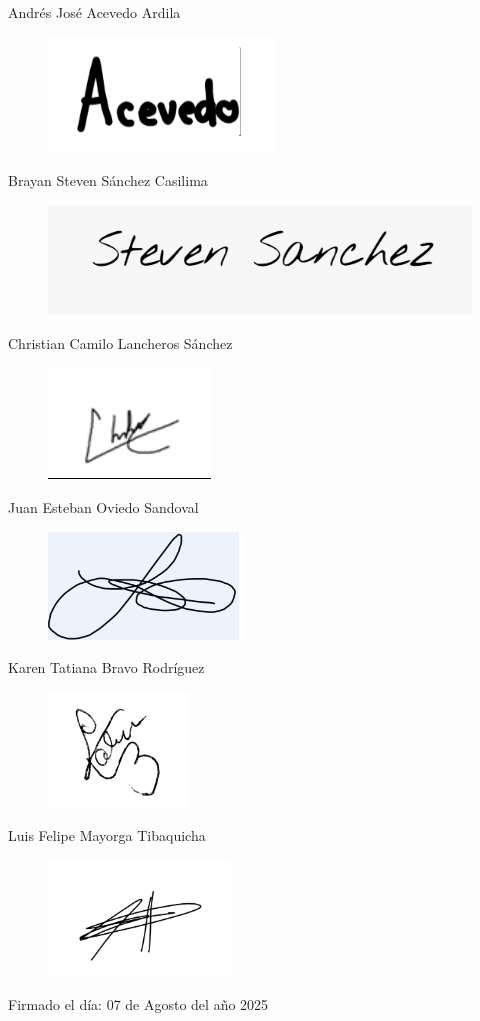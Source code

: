 Andrés José Acevedo Ardila
\begin{figure}[H]
    \centering
    \includegraphics[width=0.2\linewidth]{firmas/firma-andres.png}
\end{figure}

Brayan Steven Sánchez Casilima
\begin{figure}[H]
    \centering
    \includegraphics[width=0.2\linewidth]{firmas/firma-steveb.png}
\end{figure}

Christian Camilo Lancheros Sánchez
\begin{figure}[H]
    \centering
    \includegraphics[width=0.2\linewidth]{firmas/firma-cris.png}
\end{figure}

Juan Esteban Oviedo Sandoval
\begin{figure}[H]
    \centering
    \includegraphics[width=0.2\linewidth]{firmas/firma-esteban.png}
\end{figure}

Karen Tatiana Bravo Rodríguez
\begin{figure}[H]
    \centering
    \includegraphics[width=0.2\linewidth]{firmas/firma-karen.png}
\end{figure}

Luis Felipe Mayorga Tibaquicha
\begin{figure}[H]
    \centering
    \includegraphics[width=0.2\linewidth]{firmas/firma-felipe.png}
\end{figure}

Firmado el día:
07 de Agosto del año 2025
